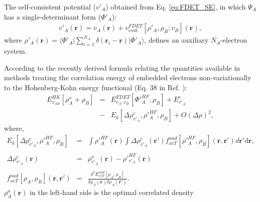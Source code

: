 \documentclass[journal=jctcce,manuscript=article]{achemso}
\begin{document}
The self-consistent potential ($v'_A$) obtained from Eq. \ref {eq:FDET_SE}, in which $\Psi_A$ has a single-determinant form ($\Phi'_A$):
\begin{eqnarray}
v'_A(\mathbf{r})=v_A(\mathbf{r})+v_{emb}^{{FDET}}[\rho'_A,\rho_B; v_B](\mathbf{r})\label{eq:def_v'},
\end{eqnarray}
where $\rho'_A(\mathbf{r})=\langle\Phi'_A\vert\sum_{i=1}^{N_{A}}\delta(\mathbf{r}_i-\mathbf{r})\vert\Phi'_A\rangle$,
defines an auxiliary $N_A$-electron system.


According to the recently derived formula relating the quantities available in methods treating the correlation energy of embedded electrons non-variationally to the Hohenberg-Kohn energy functional (Eq. 38 in Ref. ): 
\begin{eqnarray} \label{eq:E_FDET_gnovc}
 E_{v_{AB}}^{HK}[\rho_A^{o}+\rho_B] &=& E_{v_{A},{v_B}}^{FDET}[\Phi'^{HF}_{A},\rho_B] + E^{c}_{v'_A} 
 \\ \nonumber
 &-& E_k[\Delta \rho^{c}_{v'_A}, \rho'^{HF}_A, \rho_B] + O(\Delta\rho)^2, %
 \end{eqnarray}
where,
\begin{eqnarray}
\label{eq:nkernel}
 E_k[\Delta \rho^{c}_{v'_A}, \rho'^{HF}_A, \rho_B] &=&
  \int \rho'^{HF}_A(\mathbf{r})  \int \Delta \rho^{c}_{v'_A}(\mathbf{r'}) f^{nad}_{xcT}[\rho'^{HF}_A, \rho_B](\mathbf{r},\mathbf{r'})d\mathbf{r'}\mathrm{d}\mathbf{r},\\
  \nonumber \\ \label{eq:def_corrdens}
  \Delta \rho^{c}_{v'_A}(\mathbf{r})&=&\rho^{o}_{v'_A}(\mathbf{r})-\rho'^{HF}_{v'_A}(\mathbf{r})\\
  \nonumber \\
 \label{eq:nf_nad}
 f^{nad}_{xcT}[\rho_A, \rho_B](\mathbf{r},\mathbf{r'}) &=& \frac{\delta^2 E^{nad}_{xcT}[\rho_A, \rho_B]}{\delta \rho_A(\mathbf{r}) \delta \rho_A(\mathbf{r'})}.
\end{eqnarray}
$\rho_A^{o}(\mathbf{r})$ in the left-hand side is the optimal correlated density
\end{document}

